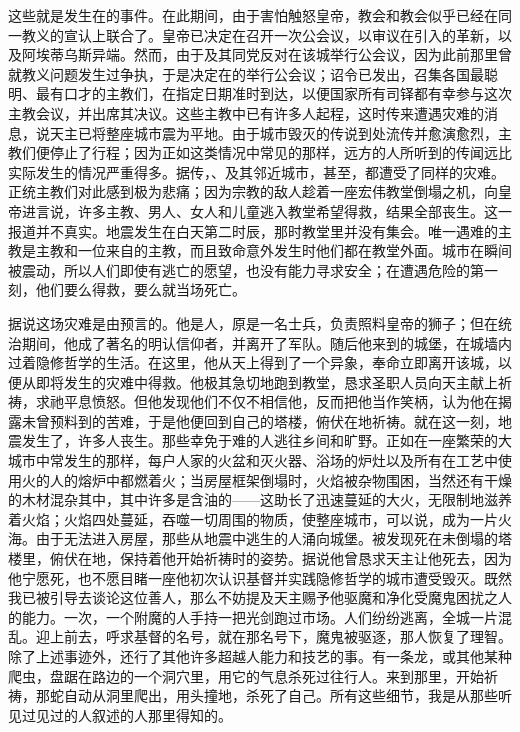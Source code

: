 这些就是发生在的事件。在此期间，由于害怕触怒皇帝，教会和教会似乎已经在同一教义的宣认上联合了。皇帝已决定在召开一次公会议，以审议在引入的革新，以及阿埃蒂乌斯异端。然而，由于及其同党反对在该城举行公会议，因为此前那里曾就教义问题发生过争执，于是决定在的举行公会议；诏令已发出，召集各国最聪明、最有口才的主教们，在指定日期准时到达，以便国家所有司铎都有幸参与这次主教会议，并出席其决议。这些主教中已有许多人起程，这时传来遭遇灾难的消息，说天主已将整座城市震为平地。由于城市毁灭的传说到处流传并愈演愈烈，主教们便停止了行程；因为正如这类情况中常见的那样，远方的人所听到的传闻远比实际发生的情况严重得多。据传，、及其邻近城市，甚至，都遭受了同样的灾难。正统主教们对此感到极为悲痛；因为宗教的敌人趁着一座宏伟教堂倒塌之机，向皇帝进言说，许多主教、男人、女人和儿童逃入教堂希望得救，结果全部丧生。这一报道并不真实。地震发生在白天第二时辰，那时教堂里并没有集会。唯一遇难的主教是主教和一位来自的主教，而且致命意外发生时他们都在教堂外面。城市在瞬间被震动，所以人们即使有逃亡的愿望，也没有能力寻求安全；在遭遇危险的第一刻，他们要么得救，要么就当场死亡。\par

据说这场灾难是由预言的。他是人，原是一名士兵，负责照料皇帝的狮子；但在统治期间，他成了著名的明认信仰者，并离开了军队。随后他来到的城堡，在城墙内过着隐修哲学的生活。在这里，他从天上得到了一个异象，奉命立即离开该城，以便从即将发生的灾难中得救。他极其急切地跑到教堂，恳求圣职人员向天主献上祈祷，求祂平息愤怒。但他发现他们不仅不相信他，反而把他当作笑柄，认为他在揭露未曾预料到的苦难，于是他便回到自己的塔楼，俯伏在地祈祷。就在这一刻，地震发生了，许多人丧生。那些幸免于难的人逃往乡间和旷野。正如在一座繁荣的大城市中常发生的那样，每户人家的火盆和灭火器、浴场的炉灶以及所有在工艺中使用火的人的熔炉中都燃着火；当房屋框架倒塌时，火焰被杂物围困，当然还有干燥的木材混杂其中，其中许多是含油的——这助长了迅速蔓延的大火，无限制地滋养着火焰；火焰四处蔓延，吞噬一切周围的物质，使整座城市，可以说，成为一片火海。由于无法进入房屋，那些从地震中逃生的人涌向城堡。被发现死在未倒塌的塔楼里，俯伏在地，保持着他开始祈祷时的姿势。据说他曾恳求天主让他死去，因为他宁愿死，也不愿目睹一座他初次认识基督并实践隐修哲学的城市遭受毁灭。既然我已被引导去谈论这位善人，那么不妨提及天主赐予他驱魔和净化受魔鬼困扰之人的能力。一次，一个附魔的人手持一把光剑跑过市场。人们纷纷逃离，全城一片混乱。迎上前去，呼求基督的名号，就在那名号下，魔鬼被驱逐，那人恢复了理智。除了上述事迹外，还行了其他许多超越人能力和技艺的事。有一条龙，或其他某种爬虫，盘踞在路边的一个洞穴里，用它的气息杀死过往行人。来到那里，开始祈祷，那蛇自动从洞里爬出，用头撞地，杀死了自己。所有这些细节，我是从那些听见过见过的人叙述的人那里得知的。\par


